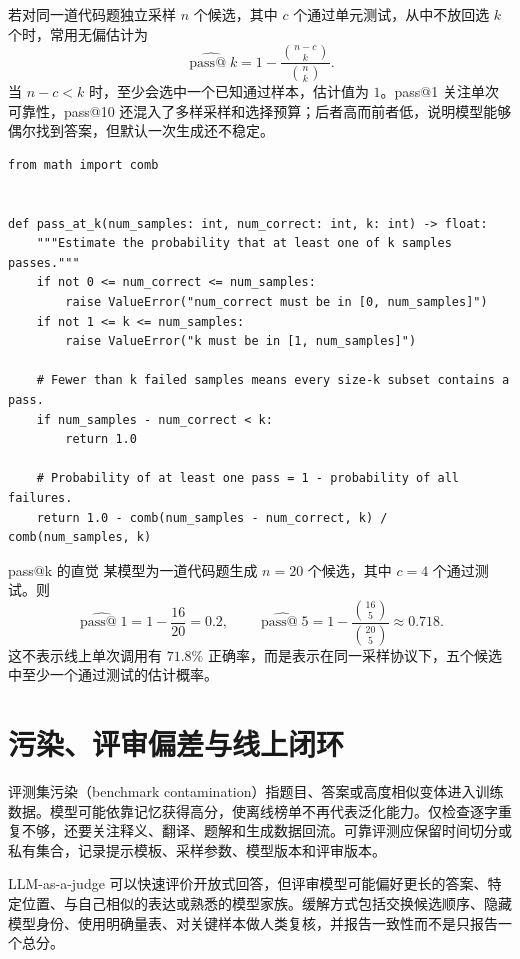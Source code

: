 若对同一道代码题独立采样 $n$ 个候选，其中 $c$ 个通过单元测试，从中不放回选 $k$ 个时，常用无偏估计为
\[
\widehat{\operatorname{pass@}k}
=1-\frac{\binom{n-c}{k}}{\binom{n}{k}}.
\]
当 $n-c<k$ 时，至少会选中一个已知通过样本，估计值为 $1$。pass@1 关注单次可靠性，pass@10 还混入了多样采样和选择预算；后者高而前者低，说明模型能够偶尔找到答案，但默认一次生成还不稳定。

\begin{lstlisting}
from math import comb


def pass_at_k(num_samples: int, num_correct: int, k: int) -> float:
    """Estimate the probability that at least one of k samples passes."""
    if not 0 <= num_correct <= num_samples:
        raise ValueError("num_correct must be in [0, num_samples]")
    if not 1 <= k <= num_samples:
        raise ValueError("k must be in [1, num_samples]")

    # Fewer than k failed samples means every size-k subset contains a pass.
    if num_samples - num_correct < k:
        return 1.0

    # Probability of at least one pass = 1 - probability of all failures.
    return 1.0 - comb(num_samples - num_correct, k) / comb(num_samples, k)
\end{lstlisting}

\begin{exercisebox}{pass@k 的直觉}
某模型为一道代码题生成 $n=20$ 个候选，其中 $c=4$ 个通过测试。则
\[
\widehat{\operatorname{pass@}1}=1-\frac{16}{20}=0.2,
\qquad
\widehat{\operatorname{pass@}5}
=1-\frac{\binom{16}{5}}{\binom{20}{5}}
\approx 0.718.
\]
这不表示线上单次调用有 $71.8\%$ 正确率，而是表示在同一采样协议下，五个候选中至少一个通过测试的估计概率。
\end{exercisebox}

\section{污染、评审偏差与线上闭环}

评测集污染（benchmark contamination）指题目、答案或高度相似变体进入训练数据。模型可能依靠记忆获得高分，使离线榜单不再代表泛化能力。仅检查逐字重复不够，还要关注释义、翻译、题解和生成数据回流。可靠评测应保留时间切分或私有集合，记录提示模板、采样参数、模型版本和评审版本。

LLM-as-a-judge 可以快速评价开放式回答，但评审模型可能偏好更长的答案、特定位置、与自己相似的表达或熟悉的模型家族。缓解方式包括交换候选顺序、隐藏模型身份、使用明确量表、对关键样本做人类复核，并报告一致性而不是只报告一个总分。

